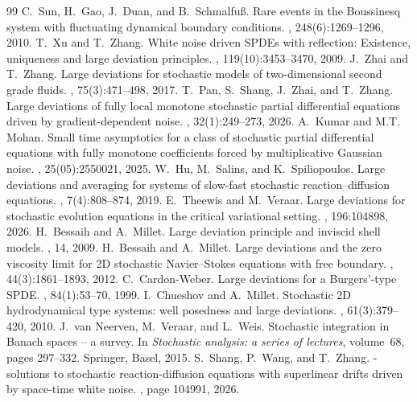 \documentclass[10pt,a4paper]{amsart}
\numberwithin{equation}{section}
\begin{document}
\begin{thebibliography}{99}
 C.~Sun, H.~Gao, J.~Duan, and B.~Schmalfuß. \newblock Rare events in the {Boussinesq} system with fluctuating dynamical boundary conditions. , 248(6):1269--1296, 2010.
 T.~Xu and T.~Zhang. \newblock White noise driven {SPDEs} with reflection: {Existence}, uniqueness and large deviation principles. , 119(10):3453--3470, 2009.
 J.~Zhai and T.~Zhang. \newblock Large deviations for stochastic models of two-dimensional second grade fluids. , 75(3):471--498, 2017.
 T.~Pan, S.~Shang, J.~Zhai, and T.~Zhang. \newblock Large deviations of fully local monotone stochastic partial differential equations driven by gradient-dependent noise. , 32(1):249--273, 2026.
 A.~Kumar and M.T. Mohan. \newblock Small time asymptotics for a class of stochastic partial differential equations with fully monotone coefficients forced by multiplicative {Gaussian} noise. , 25(05):2550021, 2025.
 W.~Hu, M.~Salins, and K.~Spiliopoulos. \newblock Large deviations and averaging for systems of slow-fast stochastic reaction–diffusion equations. , 7(4):808--874, 2019.
 E.~Theewis and M.~Veraar. \newblock Large deviations for stochastic evolution equations in the critical variational setting. , 196:104898, 2026.
 H.~Bessaih and A.~Millet. \newblock Large deviation principle and inviscid shell models. , 14, 2009.
 H.~Bessaih and A.~Millet. \newblock Large deviations and the zero viscosity limit for {2D} stochastic {Navier}–{Stokes} equations with free boundary. , 44(3):1861--1893, 2012.
 C.~Cardon-Weber. \newblock Large deviations for a {Burgers}’-type {SPDE}. , 84(1):53--70, 1999.
 I.~Chueshov and A.~Millet. \newblock Stochastic {2D} hydrodynamical type systems: well posedness and large deviations. , 61(3):379--420, 2010.
 J.~van Neerven, M.~Veraar, and L.~Weis. \newblock Stochastic integration in {B}anach spaces -- a survey. \newblock In {\em Stochastic analysis: a series of lectures}, volume~68, pages 297--332. Springer, Basel, 2015.
 S.~Shang, P.~Wang, and T.~Zhang. -solutions to stochastic reaction-diffusion equations with superlinear drifts driven by space-time white noise. , page 104991, 2026.

\end{thebibliography}
\end{document}
